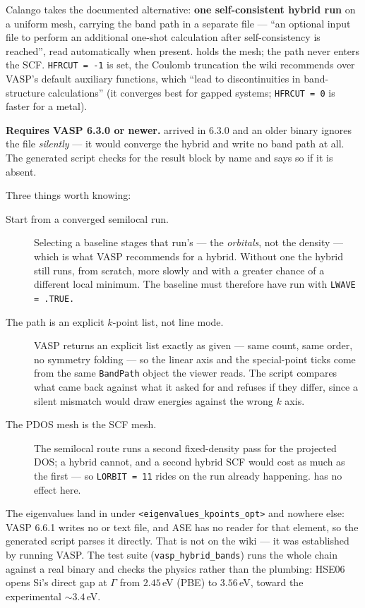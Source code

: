 Calango takes the documented alternative: \textbf{one self-consistent hybrid
run} on a uniform mesh, carrying the band path in a separate
 file --- ``an optional input file to perform an additional
one-shot calculation after self-consistency is reached'', read automatically
when present.  holds the mesh; the path never enters the SCF.
\texttt{HFRCUT = -1} is set, the Coulomb truncation the wiki recommends over
VASP's default auxiliary functions, which ``lead to discontinuities in
band-structure calculations'' (it converges best for gapped systems;
\texttt{HFRCUT = 0} is faster for a metal).

\begin{calwarn}
\textbf{Requires VASP 6.3.0 or newer.}  arrived in 6.3.0
and an older binary ignores the file \emph{silently} --- it would converge the
hybrid and write no band path at all. The generated script checks for the
result block by name and says so if it is absent.
\end{calwarn}

Three things worth knowing:

\begin{description}
  \item[Start from a converged semilocal run.] Selecting a baseline stages
    that run's  --- the \emph{orbitals}, not the density ---
    which is what VASP recommends for a hybrid. Without one the hybrid still
    runs, from scratch, more slowly and with a greater chance of a different
    local minimum. The baseline must therefore have run with
    \texttt{LWAVE = .TRUE.}
  \item[The path is an explicit $k$-point list, not line mode.] VASP returns
    an explicit list exactly as given --- same count, same order, no symmetry
    folding --- so the linear axis and the special-point ticks come from the
    same \texttt{BandPath} object the viewer reads. The script compares what
    came back against what it asked for and refuses if they differ, since a
    silent mismatch would draw energies against the wrong $k$ axis.
  \item[The PDOS mesh is the SCF mesh.] The semilocal route runs a second
    fixed-density pass for the projected DOS; a hybrid cannot, and a second
    hybrid SCF would cost as much as the first --- so \texttt{LORBIT = 11}
    rides on the run already happening.  has no effect here.
\end{description}

The eigenvalues land in  under
\texttt{<eigenvalues\_kpoints\_opt>} and nowhere else: VASP 6.6.1 writes no
 or  text file, and ASE has no reader
for that element, so the generated script parses it directly. That is not on
the wiki --- it was established by running VASP. The test suite
(\texttt{vasp\_hybrid\_bands}) runs the whole chain against a real binary and
checks the physics rather than the plumbing: HSE06 opens Si's direct gap at
$\Gamma$ from $2.45$\,eV (PBE) to $3.56$\,eV, toward the experimental
$\sim3.4$\,eV.

